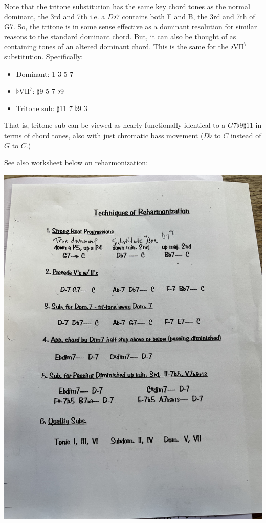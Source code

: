 \documentclass[10pt,a4paper]{article}
\begin{document}
Note that the tritone substitution has the same key chord tones as the normal dominant, the 3rd and 7th i.e. a $D\flat 7$ contains both F and B, the 3rd and 7th of G7. So, the tritone is in some sense effective as a dominant resolution for similar reasons to the standard dominant chord. But, it can also be thought of as containing tones of an altered dominant chord. This is the same for the $\flat\text{VII}^7$ substitution. Specifically:
\begin{itemize}
    \item Dominant: 1 3 5 7
    \item $\flat\text{VII}^7$: $\sharp$9 5 7 $\flat$9 
    \item Tritone sub: $\sharp$11 7 $\flat$9 3
\end{itemize}
That is, tritone sub can be viewed as nearly functionally identical to a $G7 \flat 9 \sharp 11$ in terms of chord tones, also with just chromatic bass movement ($D \flat$ to $C$ instead of $G$ to $C$.)

See also worksheet below on reharmonization:
\begin{center}
\includegraphics[scale=0.065]{reharmonization_techniques.jpg}
\end{center}
\end{document}
